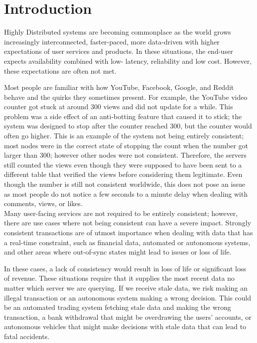 \documentclass[a4paper,10pt,titlepage]{report}
\begin{document}
    \chapter{Introduction}
    Highly Distributed systems are becoming commonplace as the world grows increasingly interconnected, faster-paced, more data-driven with higher expectations of user services and products. In these situations, the end-user expects availability combined with low- latency, reliability and low cost. However, these expectations are often not met.

    Most people are familiar with how YouTube, Facebook, Google, and Reddit behave and the quirks they sometimes present.
    For example, the YouTube video counter got stuck at around 300 views and did not update for a while. This problem was a side effect of an anti-botting feature that caused it to stick; the system was designed to stop after the counter reached 300, but the counter would often go higher. This is an example of the system not being entirely consistent; most nodes were in the correct state of stopping the count when the number got larger than 300; however other nodes were not consistent. Therefore, the servers still counted the views even though they were supposed to have been sent to a different table that verified the views before considering them legitimate. Even though the number is still not consistent worldwide, this does not pose an issue as most people do not notice a few seconds to a minute delay when dealing with comments, views, or likes.
    \\
    Many user-facing services are not required to be entirely consistent; however, there are use cases where not being consistent can have a severe impact. Strongly consistent transactions are of utmost importance when dealing with data that has a real-time constraint, such as financial data, automated or autonomous systems, and other areas where out-of-sync states might lead to issues or loss of life.

    In these cases, a lack of consistency would result in loss of life or significant loss of revenue. These situations require that it supplies the most recent data no matter which server we are querying. If we receive stale data, we risk making an illegal transaction or an autonomous system making a wrong decision. This could be an automated trading system fetching stale data and making the wrong transaction, a bank withdrawal that might be overdrawing the users' accounts, or autonomous vehicles that might make decisions with stale data that can lead to fatal accidents. \\
\end{document}
